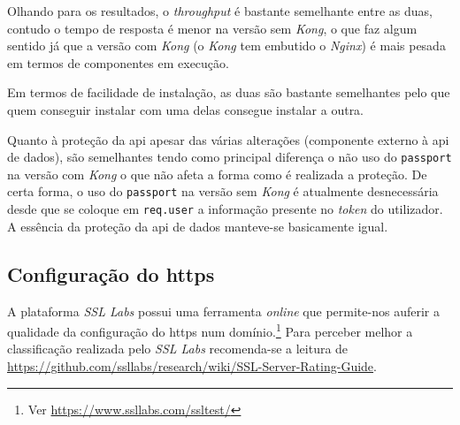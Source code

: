 Olhando para os resultados, o \textit{throughput} é bastante semelhante entre as duas, contudo o tempo de resposta é menor na versão sem \textit{Kong}, o que faz algum sentido já que a versão com \textit{Kong} (o \textit{Kong} tem embutido o \textit{Nginx}) é mais pesada em termos de componentes em execução.

Em termos de facilidade de instalação, as duas são bastante semelhantes pelo que quem conseguir instalar com uma delas consegue instalar a outra.

Quanto à proteção da \acrshort{api} apesar das várias alterações (componente externo à \acrshort{api} de dados), são semelhantes tendo como principal diferença o não uso do \texttt{passport} na versão com \textit{Kong} o que não afeta a forma como é realizada a proteção. De certa forma, o uso do \texttt{passport} na versão sem \textit{Kong} é atualmente desnecessária desde que se coloque em \texttt{req.user} a informação presente no \textit{token} do utilizador. A essência da proteção da \acrshort{api} de dados manteve-se basicamente igual.

\subsection{Configuração do \acrshort{https}}

A plataforma \textit{SSL Labs} possui uma ferramenta \textit{online} que permite-nos auferir a qualidade da configuração do \acrshort{https} num domínio.\footnote{Ver \url{https://www.ssllabs.com/ssltest/}} Para perceber melhor a classificação realizada pelo \textit{SSL Labs} recomenda-se a leitura de \url{https://github.com/ssllabs/research/wiki/SSL-Server-Rating-Guide}.

